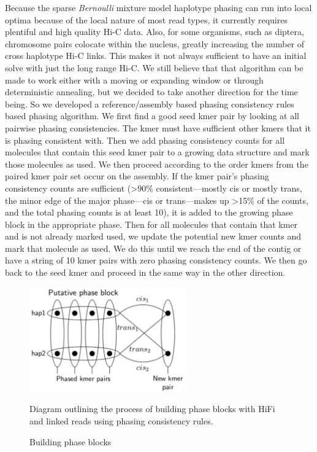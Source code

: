 {\par{
Because the sparse \textit{Bernoulli} mixture model haplotype phasing can run into local optima because of the local nature of most read types, it currently requires plentiful and high quality Hi-C data. Also, for some organisms, such as diptera, chromosome pairs colocate within the nucleus\cite{somaticpairing}, greatly increasing the number of cross haplotype Hi-C links. This makes it not always sufficient to have an initial solve with just the long range Hi-C. We still believe that that algorithm can be made to work either with a moving or expanding window or through deterministic annealing, but we decided to take another direction for the time being. So we developed a reference/assembly based phasing consistency rules based phasing algorithm. We first find a good seed kmer pair by looking at all pairwise phasing consistencies. The kmer must have sufficient other kmers that it is phasing consistent with. Then we add phasing consistency counts for all molecules that contain this seed kmer pair to a growing data structure and mark those molecules as used. We then proceed according to the order kmers from the paired kmer pair set occur on the assembly. If the kmer pair's phasing consistency counts are sufficient (>90\% consistent---mostly cis or mostly trans, the minor edge of the major phase---cis or trans---makes up >15\% of the counts, and the total phasing counts is at least 10), it is added to the growing phase block in the appropriate phase. Then for all molecules that contain that kmer and is not already marked used, we update the potential new kmer counts and mark that molecule as used. We do this until we reach the end of the contig or have a string of 10 kmer pairs with zero phasing consistency counts. We then go back to the seed kmer and proceed in the same way in the other direction.
}

\begin{figure}[htbp!]
\caption{Building phase blocks}
\label{figure:phaseblocks}
\begin{centering}
\includegraphics[width=0.6\textwidth]{phaseblockbuilding.png}
\par{Diagram outlining the process of building phase blocks with HiFi and linked reads using phasing consistency rules. }
\end{centering}
\end{figure}

}
